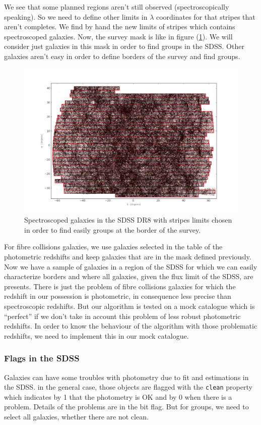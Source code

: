 We see that some planned regions aren't still observed (spectroscopically
speaking). So we need to define other limits in $\lambda$ coordinates for that
stripes that aren't completes. We find by hand the new limits of stripes which
contains spectroscoped galaxies. Now, the survey mask is like in figure
(\ref{fig:SDSSspecgalstripesnew}). We will consider just galaxies in this mask
in order to find groups in the SDSS\@. Other galaxies aren't easy in order to
define borders of the survey and find groups.
\begin{figure}[ht]
    \centering
    \includegraphics[width=\linewidth]{figures/sdss/SpectroGalStripesSDSSnew.png}
    \caption{Spectroscoped galaxies in the SDSS DR8 with stripes
    limits chosen in order to find easily groups at the border of the survey.}
\label{fig:SDSSspecgalstripesnew}
\end{figure}

For fibre collisions galaxies, we use galaxies selected in the table of the
photometric redshifts and keep galaxies that are in the mask defined
previously. Now we have a sample of galaxies in a region of the SDSS for which
we can easily characterize borders and where all galaxies, given the flux limit
of the SDSS, are presents. There is just the problem of fibre collisions
galaxies for which the redshift in our possession is photometric, in
consequence less precise than spectroscopic redshifts. But our algorithm is
tested on a mock catalogue which is ``perfect'' if we don't take in account
this problem of less robust photometric redshifts. In order to know the
behaviour of the algorithm with those problematic redshifts, we need to
implement this in our mock catalogue.
%
\subsubsection{Flags in the SDSS}
%
Galaxies can have some troubles with photometry due to fit and estimations in
the SDSS\@. in the general case, those objects are flagged with the
\texttt{clean} property which indicates by 1 that the photometry is OK
and by 0 when there is a problem. Details of the problems are in the bit
flag. But for groups, we need to select all galaxies, whether there are not
clean.

